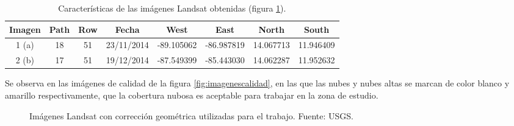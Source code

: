 \begin{table}[ht]
	\centering
	\caption[Caracerísticas de las imágenes Landsat]{Características de las imágenes Landsat obtenidas (figura \ref{fig:imagenesLandsat}).}
	\begin{tabular}{@{}cccccccc@{}}
	\toprule[0.4mm]
	Imagen & Path & Row & Fecha & West & East & North & South \\
	\midrule
	1 (a) & 18 & 51 & 23/11/2014 & -89.105062 & -86.987819 & 14.067713 & 11.946409 \\
	2 (b) & 17 & 51 & 19/12/2014 & -87.549399 & -85.443030 & 14.062287 & 11.952632 \\
	\bottomrule[0.4mm]
	\end{tabular}
	\label{tab:imagenes}
\end{table}

Se observa en las imágenes de calidad de la figura \ref{fig:imagenescalidad}, en las que las nubes y nubes altas se marcan de color blanco y amarillo respectivamente, que la cobertura nubosa es aceptable para trabajar en la zona de estudio.\Sep

\begin{figure}
	\centering
	\caption[Imágenes Landsat]{Imágenes Landsat con corrección geométrica utilizadas para el trabajo. Fuente: USGS.}
	\label{fig:imagenesLandsat}
\end{figure}

